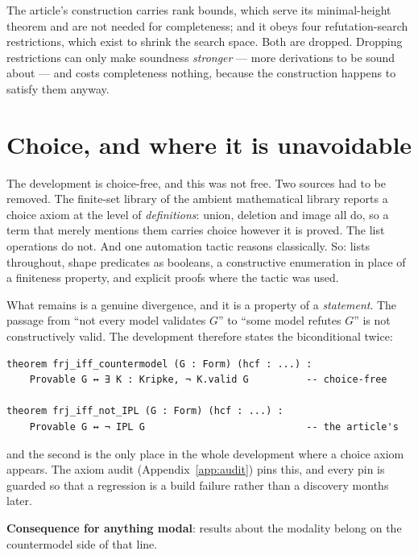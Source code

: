 \documentclass[11pt,a4paper]{article}
\begin{document}
The article's construction carries rank bounds, which serve its
minimal-height theorem and are not needed for completeness; and it obeys
four refutation-search restrictions, which exist to shrink the search
space. Both are dropped. Dropping restrictions can only make soundness
\emph{stronger} --- more derivations to be sound about --- and costs
completeness nothing, because the construction happens to satisfy them
anyway.

\section{Choice, and where it is unavoidable}
\label{sec:choice}

The development is choice-free, and this was not free. Two sources had to
be removed. The finite-set library of the ambient mathematical library
reports a choice axiom at the level of \emph{definitions}: union, deletion
and image all do, so a term that merely mentions them carries choice
however it is proved. The list operations do not. And one automation
tactic reasons classically. So: lists throughout, shape predicates as
booleans, a constructive enumeration in place of a finiteness property,
and explicit proofs where the tactic was used.

What remains is a genuine divergence, and it is a property of a
\emph{statement}. The passage from ``not every model validates $G$'' to
``some model refutes $G$'' is not constructively valid. The development
therefore states the biconditional twice:

\begin{lstlisting}
theorem frj_iff_countermodel (G : Form) (hcf : ...) :
    Provable G ↔ ∃ K : Kripke, ¬ K.valid G          -- choice-free

theorem frj_iff_not_IPL (G : Form) (hcf : ...) :
    Provable G ↔ ¬ IPL G                            -- the article's
\end{lstlisting}

\noindent
and the second is the only place in the whole development where a choice
axiom appears. The axiom audit (Appendix~\ref{app:audit}) pins this, and
every pin is guarded so that a regression is a build failure rather than a
discovery months later.

\textbf{Consequence for anything modal}: results about the modality belong
on the countermodel side of that line.

\end{document}
